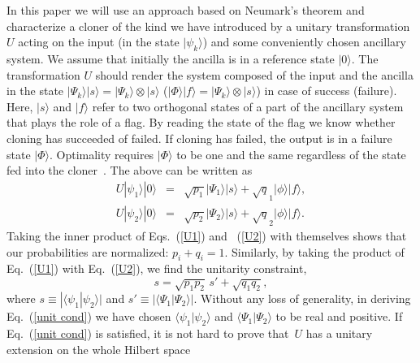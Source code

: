 \documentclass[aps,pra,twocolumn,showpacs]{revtex4-1}
\begin{document}
%
In this paper we will use an approach based on Neumark's theorem and characterize a cloner of the kind we have introduced by a unitary transformation $U$ acting on the input (in the state $|\psi_k\rangle$) and some conveniently chosen ancillary system. We assume that initially the ancilla is in a reference state $|0\rangle$. The transformation $U$ should render the system composed of the input and the ancilla in the state $|\Psi_k\rangle|s\rangle=|\Psi_k\rangle\otimes|s\rangle$ ($|\Phi\rangle|f\rangle=|\Psi_k\rangle\otimes|s\rangle$) in case of success (failure). Here, $|s\rangle$ and $|f\rangle$ refer to two orthogonal states of a part of the ancillary system that plays the role of a flag. By reading the state of the flag we know whether cloning has succeeded of failed. If cloning has failed, the output is in a failure state $|\Phi\rangle$. Optimality requires  $|\Phi\rangle$ to be one and the same regardless of the state fed into the cloner~\cite{us1,us2}. The above can be written as
%
\begin{eqnarray}
U|\psi_1\rangle|0\rangle&=& \sqrt{p_1}|\Psi_1\rangle|s\rangle +\sqrt q_1 |\phi\rangle|f\rangle,\label{U1}\\
U|\psi_2\rangle|0\rangle&=& \sqrt{p_2}|\Psi_2\rangle|s\rangle +\sqrt q_2 |\phi\rangle|f\rangle. \label{U2}
\end{eqnarray}
%
%
Taking the inner product of Eqs.~(\ref{U1}) and ~(\ref{U2}) with themselves shows that our probabilities are normalized: $p_i+q_i=1$.
Similarly, by taking the product of Eq.~(\ref{U1}) with Eq.~(\ref{U2}), we find the unitarity constraint,
%
\begin{equation}
s=\sqrt{p_1 p_2}\, s'+\sqrt{q_1 q_2},
\label{unit cond}
\end{equation}
%
where $s\equiv|\langle\psi_1|\psi_2\rangle|$ and $s'\equiv|\langle\Psi_1|\Psi_2\rangle|$. Without any loss of generality, in deriving Eq.~(\ref{unit cond}) we have chosen
$\langle {\psi_1}|{\psi_2}\rangle$ and $\langle {\Psi_1}|{\Psi_2}\rangle$ to be real and positive.
If Eq.~(\ref{unit cond}) is satisfied, it is not hard to prove that~$U$ has a unitary extension on the whole Hilbert space
\end{document}
